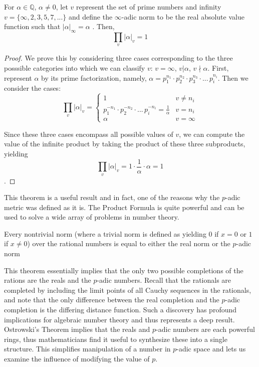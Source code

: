 \documentclass[a4paper]{article}
\begin{document}
\begin{theorem}

For $\alpha \in \mathbb{Q}$, $\alpha \neq 0$, let $v$ represent the set of prime numbers and infinity $v=\{\infty, 2, 3, 5, 7,...\}$ and define the $\infty$-adic norm to be the real absolute value function such that $|\alpha|_{\infty}=\alpha$ \cite{gouvea}. Then,
\[\prod_{v} |\alpha|_{v} =1\]

\end{theorem}

\begin{proof}
    We prove this by considering three cases corresponding to the three posssible categories into which we can classify $v$: $v = \infty$, $v | \alpha$, $v \nmid \alpha$. First, represent $\alpha$ by its prime factorization, namely, $\alpha=p_1^{n_1} \cdot p_2^{n_2} \cdot p_3^{n_3}\cdot...\,p_i^{n_i}$. Then we consider the cases:
    \[\prod_{v} |\alpha|_{v} = \begin{cases} 
      1 & v \neq n_i \\
     p_1^{-n_1} \cdot p_2^{-n_2}\cdot...\,p_i^{-n_i} = \frac{1}{\alpha} & v = n_i\\
     \alpha & v=\infty
   \end{cases}\]
    
    Since these three cases encompass all possible values of $v$, we can compute the value of the infinite product by taking the product of these three subproducts, yielding
    \[\prod_{v} |\alpha|_{v} = 1\cdot \frac{1}{\alpha} \cdot \alpha =1\].
\end{proof}

This theorem is a useful result and in fact, one of the reasons why the $p$-adic metric was defined as it is. The Product Formula is quite powerful and can be used to solve a wide array of problems in number theory.

\begin{theorem}

Every nontrivial norm (where a trivial norm is defined as yielding $0$ if $x=0$ or $1$ if $x \neq 0$) over the rational numbers is equal to either the real norm or the $p$-adic norm

\end{theorem}

This theorem essentially implies that the only two possible completions of the rations are the reals and the $p$-adic numbers. Recall that the rationals are completed by including the limit points of all Cauchy sequences in the rationals, and note that the only difference between the real completion and the $p$-adic completion is the differing distance function. Such a discovery has profound implications for algebraic number theory and thus represents a deep result. Ostrowski's Theorem implies that the reals and $p$-adic numbers are each powerful rings, thus mathematicians find it useful to synthesize these into a single structure. This simplifies manipulation of a number in $p$-adic space and lets us examine the influence of modifying the value of $p$.
\end{document}
